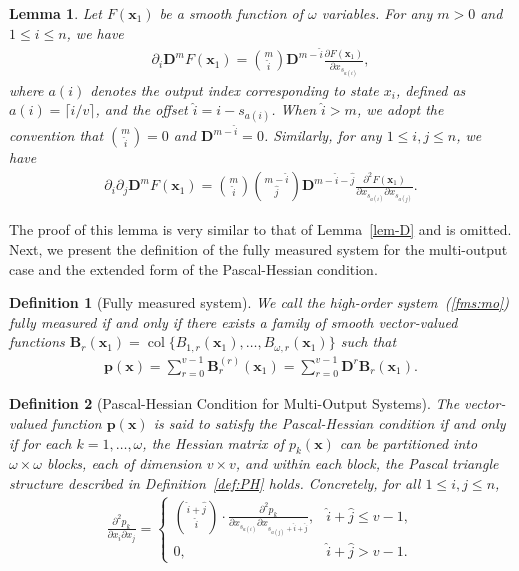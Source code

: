 \documentclass[11pt]{article}
\newtheorem{lemma}{Lemma}
\newtheorem{definition}{Definition}
\DeclareMathOperator{\col}{col}
\begin{document}
\begin{lemma}\label{lem:D-multi}
	Let $F(\bm{x}_1)$ be a smooth function of $\omega$ variables. For any $m>0$ and $1\leq i\leq n$, we have
	\begin{align}
		\partial_i\bm{D}^mF(\bm{x}_1)=\binom{m}{\hat{i}}\bm{D}^{m-\hat{i}}\frac{\partial F(\bm{x}_1)}{\partial x_{s_{a(i)}}},
	\end{align}
	where $a(i)$ denotes the output index corresponding to state $x_i$, defined as $a(i)=\lceil i/v\rceil$, and the offset $\hat{i}=i-s_{a(i)}$. When $\hat{i}>m$, we adopt the convention that $\binom{m}{\hat{i}}=0$ and $\bm{D}^{m-\hat{i}}=0$. Similarly, for any $1\leq i,j\leq n$, we have
	\begin{align}\label{2order}
		\partial_i\partial_j\bm{D}^mF(\bm{x}_1)=\binom{m}{\hat{i}}\binom{m-\hat{i}}{\hat{j}}\bm{D}^{m-\hat{i}-\hat{j}}\frac{\partial^2 F(\bm{x}_1)}{\partial x_{s_{a(i)}}\partial x_{s_{a(j)}}}.
	\end{align}
\end{lemma}

The proof of this lemma is very similar to that of Lemma~\ref{lem-D} and is omitted. Next, we present the definition of the fully measured system for the multi-output case and the extended form of the Pascal-Hessian condition.
\begin{definition}[Fully measured system]\label{FMS-MO}
	We call the high-order system~(\ref{fms:mo}) fully measured if and only if there exists a family of smooth vector-valued functions $\bm{B}_r(\bm{x}_1)=\col\{B_{1,r}(\bm{x}_1),\ldots,B_{\omega,r}(\bm{x}_1)\}$ such that
	\begin{align}
		\bm{p}(\bm{x})=\sum_{r=0}^{v-1}\bm{B}_{r}^{(r)}(\bm{x}_1)=\sum_{r=0}^{v-1}\bm{D}^r\bm{B}_{r}(\bm{x}_1).
	\end{align}
\end{definition}

\begin{definition}[Pascal-Hessian Condition for Multi-Output Systems]\label{PH:MO}
	The vector-valued function $\bm{p}(\bm{x})$ is said to satisfy the Pascal-Hessian condition if and only if for each $k=1,\ldots,\omega$, the Hessian matrix of $p_k(\bm{x})$ can be partitioned into $\omega\times\omega$ blocks, each of dimension $v\times v$, and within each block, the Pascal triangle structure described in Definition~\ref{def:PH} holds. Concretely, for all $1\leq i,j\leq n$,
	\begin{align}
		\frac{\partial^2 p_k}{\partial x_i \partial x_j} =
		\begin{cases}
			\displaystyle \binom{\hat{i}+\hat{j}}{\hat{i}} \cdot \frac{\partial^2 p_k}{\partial x_{s_{a(i)}} \partial x_{s_{a(j)}+\hat{i}+\hat{j}}}, & \hat{i}+\hat{j}\leq v-1,\\[1.5em]
			0, & \hat{i}+\hat{j}>v-1.
		\end{cases}
	\end{align}
\end{definition}
\end{document}
